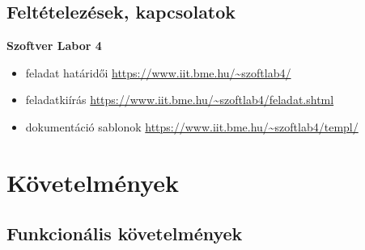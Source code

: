 \subsection{Feltételezések, kapcsolatok}
\textbf{Szoftver Labor 4}
\begin{itemize}
\item feladat határidői \url{https://www.iit.bme.hu/~szoftlab4/}
\item feladatkiírás \url{https://www.iit.bme.hu/~szoftlab4/feladat.shtml}
\item dokumentáció sablonok \url{https://www.iit.bme.hu/~szoftlab4/templ/}
\end{itemize}

 

\section{Követelmények}
\subsection{Funkcionális követelmények}

